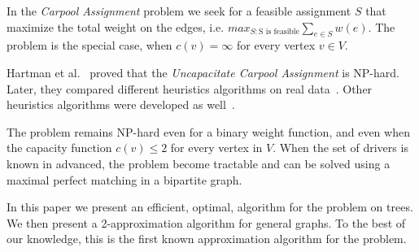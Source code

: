 In the \emph{Carpool Assignment} problem we seek for a feasible assignment
$S$ that maximize the total weight on the edges, 
i.e. $max_{S : \text{S is feasible}} \sum_{e \in S}{w(e)}$.
The \uca{} problem is the special case,
when $c(v) = \infty$ for every vertex $v \in V$.

Hartman et al.~\cite{hartman2013optimal} proved that the \emph{Uncapacitate
Carpool Assignment} is NP-hard.
Later, they compared different heuristics algorithms on real data~\cite{hartman2014theory}.
Other heuristics algorithms were developed as well~\cite{knapen2014exploiting}.

The problem remains NP-hard even for a binary weight function, and even when
the capacity function $c(v) \leq 2$ for every vertex in $V$.
When the set of drivers is known in advanced, the problem become tractable and
can be solved using a maximal perfect matching in a bipartite graph.

In this paper we present an efficient, optimal, algorithm for the
\uca{} problem on trees.
We then present a 2-approximation algorithm for general graphs.
To the best of our knowledge, this is the first known approximation algorithm
for the problem.
